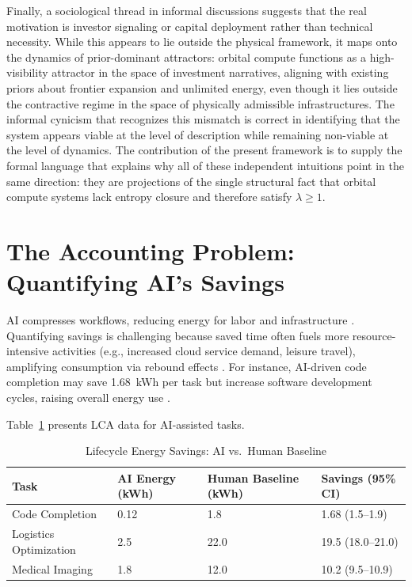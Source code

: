 \documentclass[11pt,a4paper]{article}
\theoremstyle{plain}
\theoremstyle{definition}
\theoremstyle{remark}
\begin{document}
Finally, a sociological thread in informal discussions suggests that the real
motivation is investor signaling or capital deployment rather than technical
necessity. While this appears to lie outside the physical framework, it maps
onto the dynamics of prior-dominant attractors: orbital compute functions as a
high-visibility attractor in the space of investment narratives, aligning with
existing priors about frontier expansion and unlimited energy, even though it
lies outside the contractive regime in the space of physically admissible
infrastructures. The informal cynicism that recognizes this mismatch is correct
in identifying that the system appears viable at the level of description while
remaining non-viable at the level of dynamics. The contribution of the present
framework is to supply the formal language that explains why all of these
independent intuitions point in the same direction: they are projections of the
single structural fact that orbital compute systems lack entropy closure and
therefore satisfy $\lambda \geq 1$.

\section{The Accounting Problem: Quantifying AI's Savings}
\label{sec:accounting}

AI compresses workflows, reducing energy for labor and infrastructure
\citep{iea2023}. Quantifying savings is challenging because saved time often
fuels more resource-intensive activities (e.g., increased cloud service demand,
leisure travel), amplifying consumption via rebound effects
\citep{sorrell2009,jevons1865,brookes1990}. For instance, AI-driven code
completion may save 1.68~kWh per task but increase software development cycles,
raising overall energy use \citep{hilty2014}.

Table~\ref{tab:lca} presents LCA data for AI-assisted tasks.

\begin{table}[h]
\centering
\caption{Lifecycle Energy Savings: AI vs.\ Human Baseline}
\label{tab:lca}
\begin{tabular}{llll}
\toprule
Task & AI Energy (kWh) & Human Baseline (kWh) & Savings (95\% CI) \\
\midrule
Code Completion        & 0.12 & 1.8  & 1.68 (1.5--1.9)   \\
Logistics Optimization & 2.5  & 22.0 & 19.5 (18.0--21.0) \\
Medical Imaging        & 1.8  & 12.0 & 10.2 (9.5--10.9)  \\
\bottomrule
\end{tabular}
\end{table}
\end{document}
